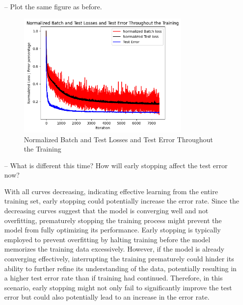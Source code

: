 \documentclass[a4paper, 12pt]{article}
\begin{document}
\begin{itemize}
    \item[--] \textcolor{myblue}{Plot the same figure as before.}
    
    \begin{figure}[H]
        \centering
        \includegraphics[width=0.8\textwidth]{../figs/1-2-4--1.png}
        \caption{Normalized Batch and Test Losses and Test Error Throughout the Training}
        \label{fig:scenario1}
    \end{figure}
    
    \item[--] \textcolor{myblue}{What is different this time? How will early stopping affect the test error now?}
    \item[] With all curves decreasing, indicating effective learning from the entire training set, 
    early stopping could potentially increase the error rate. 
    Since the decreasing curves suggest that the model is converging well and not overfitting, 
    prematurely stopping the training process might prevent the model from fully optimizing its performance. 
    Early stopping is typically employed to prevent overfitting by halting training before the model 
    memorizes the training data excessively. 
    However, if the model is already converging effectively, interrupting the training prematurely 
    could hinder its ability to further refine its understanding of the data, potentially resulting 
    in a higher test error rate than if training had continued. 
    Therefore, in this scenario, early stopping might not only fail to significantly 
    improve the test error but could also potentially lead to an increase in the error rate.

\end{itemize}
\end{document}
